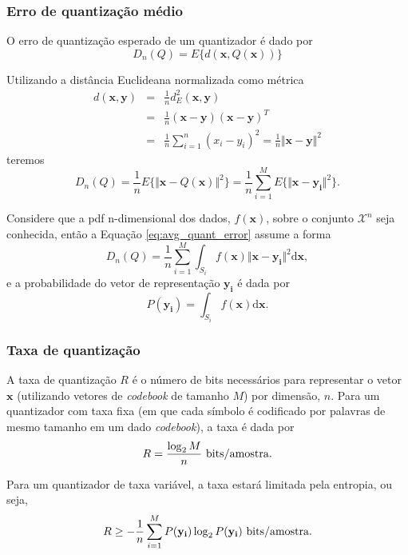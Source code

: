 \begin{frame}[allowframebreaks]
  \frametitle{Erro de quantização médio}
  O erro de quantização esperado de um quantizador é dado por
  \begin{equation}
  D_n(Q) = E \{ d(\mathbf{x},Q(\mathbf{x})) \}
  \end{equation}

  Utilizando a distância Euclideana normalizada como métrica
  \begin{eqnarray}
  d(\mathbf{x},\mathbf{y}) &=& \frac{1}{n} d^2_E(\mathbf{x},\mathbf{y}) \nonumber \\
                           &=& \frac{1}{n} (\mathbf{x} - \mathbf{y}) (\mathbf{x} - \mathbf{y})^T \nonumber \\
                           &=& \frac{1}{n} \sum_{i=1}^n (x_i - y_i)^2 = \frac{1}{n} \Vert \mathbf{x} - \mathbf{y} \Vert^2
  \end{eqnarray}
  teremos
  \vspace{-1ex}
  \begin{equation}
  D_n (Q) = \frac{1}{n} E \{ \Vert \mathbf{x} - Q(\mathbf{x}) \Vert^2 \} = \frac{1}{n} \sum_{i=1}^M  E \{ \Vert \mathbf{x} - \mathbf{y_i} \Vert^2 \} .
  \label{eq:avg_quant_error}
  \end{equation}
 
  \framebreak
  Considere que a pdf n-dimensional dos dados, $f(\mathbf{x})$, sobre o conjunto $\mathcal{X}^n$ seja conhecida, 
  então a Equação \ref{eq:avg_quant_error} assume a forma 
  \begin{equation}
  D_n (Q) = \frac{1}{n} \sum_{i=1}^M \int_{S_i} f(\mathbf{x}) \Vert \mathbf{x} - \mathbf{y_i} \Vert^2 \mathrm{d}\mathbf{x} ,
  \end{equation}
  e a probabilidade do vetor de representação $\mathbf{y_i}$ é dada por
  \begin{equation}
  P(\mathbf{y_i}) = \int_{S_i} f(\mathbf{x}) \mathrm{d}\mathbf{x} .
  \end{equation}
\end{frame} 


\begin{frame}%
  \frametitle{Taxa de quantização}
  A taxa de quantização $R$ é o número de bits necessários para representar o vetor $\mathbf{x}$
  (utilizando vetores de \textit{codebook} de tamanho $M$) por dimensão, $n$. Para um quantizador com taxa fixa
  (em que cada símbolo é codificado por palavras de mesmo tamanho em um dado \textit{codebook}), 
  a taxa é dada por
  \begin{equation}
  R = \frac{\log_2 M}{n} \textmd{ bits/amostra}.
  \end{equation}

  Para um quantizador de taxa variável, a taxa estará limitada pela entropia, ou seja,
  \begin{equation}
  R \geq - \frac{1}{n} \sum_{i=1}^M P(\mathbf{y_i}) \log_2 P(\mathbf{y_i}) \textmd{ bits/amostra}.
  \end{equation}
\end{frame}

